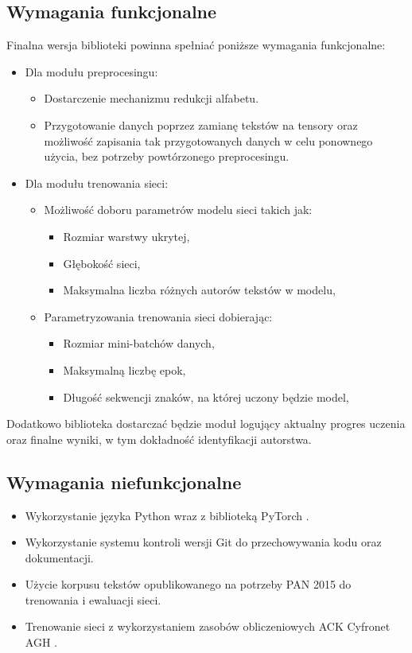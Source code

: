 \subsection{Wymagania funkcjonalne}
Finalna wersja biblioteki powinna spełniać poniższe wymagania funkcjonalne:
\begin{itemize}
 	\item Dla modułu preprocesingu:
	    \begin{itemize}
		    \item Dostarczenie mechanizmu redukcji alfabetu.
		    \item Przygotowanie danych poprzez zamianę tekstów na tensory oraz możliwość 
				zapisania tak przygotowanych danych w celu ponownego użycia, bez potrzeby
				powtórzonego preprocesingu. 
	    \end{itemize}
 	\item Dla modułu trenowania sieci:
		\begin{itemize}
			\item Możliwość doboru parametrów modelu sieci takich jak:
				\begin{itemize}
			    	\item Rozmiar warstwy ukrytej,
			    	\item Głębokość sieci,
			    	\item Maksymalna liczba różnych autorów tekstów w modelu,
		    	\end{itemize}
			\item Parametryzowania trenowania sieci dobierając:
				\begin{itemize}
			    	\item Rozmiar mini-batchów danych,
			    	\item Maksymalną liczbę epok,
			    	\item Długość sekwencji znaków, na której uczony będzie model,
		    	\end{itemize}
		  \end{itemize}
\end{itemize}
Dodatkowo biblioteka dostarczać będzie moduł logujący aktualny progres uczenia 
oraz finalne wyniki, w tym dokładność identyfikacji autorstwa.	

\subsection{Wymagania niefunkcjonalne}
\begin{itemize}
 	\item Wykorzystanie języka Python wraz z biblioteką PyTorch \cite{pytorch}.
 	\item Wykorzystanie systemu kontroli wersji Git do przechowywania kodu oraz dokumentacji.
 	\item Użycie korpusu tekstów opublikowanego na potrzeby PAN 2015 \cite{pan} do trenowania i ewaluacji sieci.
 	\item Trenowanie sieci z wykorzystaniem zasobów obliczeniowych ACK Cyfronet AGH \cite{plgrid}.
\end{itemize}
